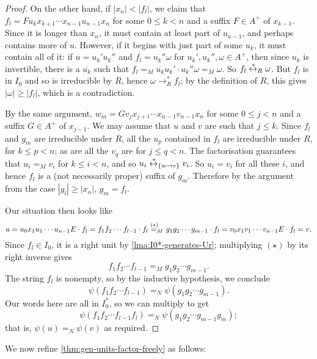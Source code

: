 \documentclass[noindex,noinsetproof,12pt]{lmaths}
\newcommand{\leftrightst}{\mathrel{\smash{\stackrel{\hspace{0.1em}\ast}{\leftrightarrow}}}}
\begin{document}
\begin{proof}
	On the other hand, if $|x_n| < |f_l|$, we claim that $f_l = Fu_k x_{k+1} \cdots x_{n-1}u_{n-1}x_n$ for some $0 \le k < n$ and a suffix $F \in A^+$ of $x_{k-1}$. Since it is longer than $x_n$, it must contain at least part of $u_{n-1}$, and perhaps contains more of $u$. However, if it begins with just part of some $u_k$, it must contain all of it: if $u = u_k'u_k''$ and $f_l = u_k''\omega$ for $u_k', u_k'', \omega \in A^+$, then since $u_k$ is invertible, there is a $\overline{u_k}$ such that $f_l =_M \overline{u_k}u_k' \cdot u_k''\omega =_M \omega$. So $f_l \leftrightst_R \omega$. But $f_l$ is in $I_0$ and so is irreducible by $R$, hence $\omega \to^*_R f_l$; by the definition of $R$, this gives $|\omega| \ge |f_l|$, which is a contradiction.

	By the same argument, $w_m = Gv_jx_{j+1} \cdots x_{n-1}v_{n-1}x_n$ for some $0 \le j < n$ and a suffix $G \in A^+$ of $x_{j-1}$. We may assume that $u$ and $v$ are such that $j \le k$. Since $f_l$ and $g_m$ are irreducible under $R$, all the $u_p$ contained in $f_l$ are irreducible under $R$, for $k \le p < n$; as are all the $v_q$ are for $j \le q < n$. The factorisation guarantees that $u_i =_M v_i$ for $k \le i < n$, and so $u_i \leftrightst_{\{w\to\epsilon\}} v_i$. So $u_i = v_i$ for all these $i$, and hence $f_l$ is a (not necessarily proper) suffix of $g_m$. Therefore by the argument from the case $|g_l| \ge |x_n|$, $g_m = f_l$.

	Our situation then looks like
		\[ u =  u_0x_1u_1\cdots u_{n-1}E \cdot f_l = f_1f_2\cdots f_{l-1} \cdot f_l \stackrel{(\star)\hphantom{{}_M}}{=_M} g_1g_2\cdots g_{m-1} \cdot f_l = v_0x_1v_1\cdots v_{n-1}E \cdot f_l = v. \]
	Since $f_l \in I_0$, it is a right unit by \cref{lma:I0*-generates-Ur}; multiplying $(\star)$ by its right inverse gives
		\[ f_1f_2\cdots f_{l-1} =_M g_1g_2\cdots g_{m-1}. \]
	The string $f_l$ is nonempty, so by the inductive hypothesis, we conclude
		\[ \psi(f_1 f_2 \cdots f_{l-1}) =_N \psi(g_1 g_2\cdots g_{m-1}). \]
	Our words here are all in $I_0^*$, so we can multiply to get
		\[ \psi(f_1 f_2 \cdots f_{l-1} f_l) =_N \psi(g_1 g_2\cdots g_{m-1} g_m); \]
	that is, $\psi(u) =_N \psi(v)$ as required.
\end{proof}


We now refine \cref{thm:gen-units-factor-freely} as follows:
\end{document}
